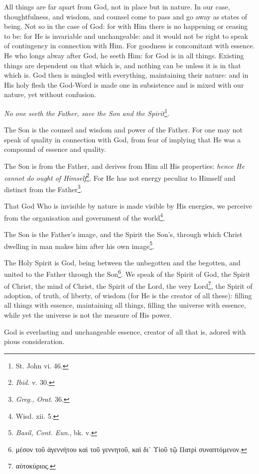 All things are far apart from God, not in place but in nature. In our case, thoughtfulness, and wisdom, and counsel come to pass and go away as states of being. Not so in the case of God: for with Him there is no happening or ceasing to be: for He is invariable and unchangeable: and it would not be right to speak of contingency in connection with Him. For goodness is concomitant with essence. He who longs alway after God, he seeth Him: for God is in all things. Existing things are dependent on that which is, and nothing can be unless it is in that which is. God then is mingled with everything, maintaining their nature: and in His holy flesh the God-Word is made one in subsistence and is mixed with our nature, yet without confusion.

\emph{No one seeth the Father, save the Son and the Spirit}\footnote{St. John vi. 46.}.

The Son is the counsel and wisdom and power of the Father. For one may not speak of quality in connection with God, from fear of implying that He was a compound of essence and quality.

The Son is from the Father, and derives from Him all His properties: \emph{hence He cannot do ought of Himself}\footnote{\emph{Ibid. }v. 30.}. For He has not energy peculiar to Himself and distinct from the Father\footnote{\emph{Greg., Orat}. 36.}.

That God Who is invisible by nature is made visible by His energies, we perceive from the organisation and government of the world\footnote{Wisd. xii. 5.}.

The Son is the Father’s image, and the Spirit the Son’s, through which Christ dwelling in man makes him after his own image\footnote{\emph{Basil, Cont. Eun}., bk. v.}.

The Holy Spirit is God, being between the unbegotten and the begotten, and united to the Father through the Son\footnote{\textgreek{μέσον τοῦ ἀγεννήτου καὶ τοῦ γεννητοῦ, καὶ δι᾽ Υἱοῦ τῷ Πατρὶ συναπτόμενον}.}. We speak of the Spirit of God, the Spirit of Christ, the mind of Christ, the Spirit of the Lord, the very Lord\footnote{\textgreek{αὐτοκύριος}.}, the Spirit of adoption, of truth, of liberty, of wisdom (for He is the creator of all these): filling all things with essence, maintaining all things, filling the universe with essence, while yet the universe is not the measure of His power.

God is everlasting and unchangeable essence, creator of all that is, adored with pious consideration.

